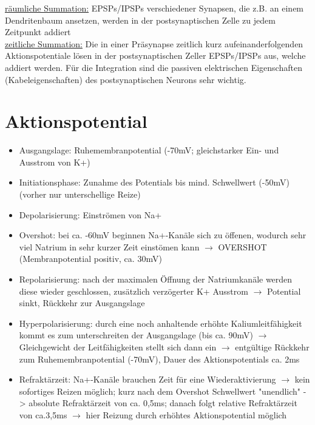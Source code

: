 \documentclass[12pt,a4paper]{article}
\begin{document}
\underline{räumliche Summation:} EPSPs/IPSPs verschiedener Synapsen, die z.B. an einem Dendritenbaum ansetzen, werden in der postsynaptischen Zelle zu jedem Zeitpunkt addiert\\

\underline{zeitliche Summation:} Die in einer Präsynapse zeitlich kurz aufeinanderfolgenden Aktionspotentiale lösen in der postsynaptischen Zeller EPSPs/IPSPs aus, welche addiert werden.
Für die Integration sind die passiven elektrischen Eigenschaften (Kabeleigenschaften) des postsynaptischen Neurons sehr wichtig.


\section{Aktionspotential}
	\begin{itemize}
		\item Ausgangslage: Ruhemembranpotential (-70mV; gleichstarker Ein- und Ausstrom von K+)
		\item Initiationsphase: Zunahme des Potentials bis mind. Schwellwert (-50mV) (vorher nur unterschellige Reize)
		\item Depolarisierung: Einströmen von Na+
		\item Overshot: bei ca. -60mV beginnen Na+-Kanäle sich zu öffenen, wodurch sehr viel Natrium in sehr kurzer Zeit einstömen kann $\rightarrow$ OVERSHOT (Membranpotential positiv, ca. 30mV)
		\item Repolarisierung: nach der maximalen Öffnung der Natriumkanäle werden diese wieder geschlossen, zusätzlich verzögerter K+ Ausstrom $\rightarrow$ Potential sinkt, Rückkehr zur Ausgangslage
		\item Hyperpolarisierung: durch eine noch anhaltende erhöhte Kaliumleitfähigkeit kommt es zum unterschreiten der Ausgangslage (bis ca. 90mV) $\rightarrow$ Gleichgewicht der Leitfähigkeiten stellt sich dann ein $\rightarrow$ entgültige Rückkehr zum Ruhemembranpotential (-70mV), Dauer des Aktionspotentials ca. 2ms
		\item Refraktärzeit: Na+-Kanäle brauchen Zeit für eine Wiederaktivierung $\rightarrow$ kein sofortiges Reizen möglich; kurz nach dem Overshot Schwellwert "unendlich" -> absolute Refraktärzeit von ca. 0,5ms; danach folgt relative Refraktärzeit von ca.3,5ms $\rightarrow$ hier Reizung durch erhöhtes Aktionspotential möglich
	\end{itemize}
\end{document}
